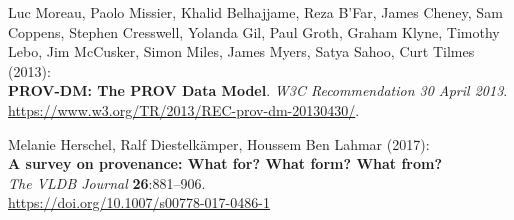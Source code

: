 \documentclass[10pt,letterpaper]{article}
\begin{document}
\nolinenumbers

%
%
% 
\begin{thebibliography}{10}

\setlength{\parskip}{6pt}
\setlength{\itemsep}{0pt plus 0.3ex}


\begin{small}











Luc Moreau, Paolo Missier, Khalid Belhajjame, Reza B'Far, James Cheney, Sam Coppens, Stephen Cresswell, Yolanda Gil, Paul Groth, Graham Klyne, Timothy Lebo, Jim McCusker, Simon Miles, James Myers, Satya Sahoo, Curt Tilmes (2013):\\
\textbf{PROV-DM: The PROV Data Model}.
\emph{W3C Recommendation 30 April 2013}.\\
\url{https://www.w3.org/TR/2013/REC-prov-dm-20130430/}.

 Melanie Herschel, Ralf Diestelkämper, Houssem Ben Lahmar (2017):\\
\textbf{A survey on provenance: What for? What form? What from?}\\
\emph{The VLDB Journal} \textbf{26}:881--906.\\
\url{https://doi.org/10.1007/s00778-017-0486-1}


\end{small}
\end{thebibliography}
\end{document}

